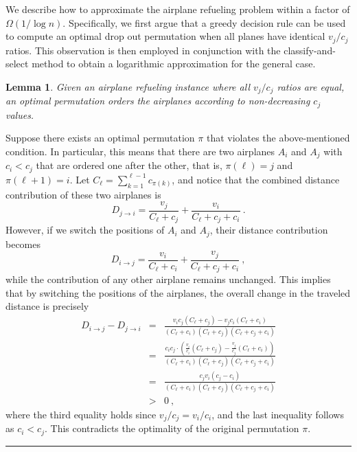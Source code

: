 \documentclass[11pt]{article}
\theoremstyle{plain}
\newtheorem{lemma}[theorem]{Lemma}
\theoremstyle{definition}
\newcommand{\qedsymb}{\hfill{\rule{2mm}{2mm}}}
\renewenvironment{proof}{\begin{trivlist} \item[\hspace{\labelsep}{\bf \noindent Proof.\/}] }{\qedsymb\end{trivlist}}\newenvironment{proofof}[1]{\begin{trivlist} \item[\hspace{\labelsep}{\bf \noindent Proof of #1.\/}] }{\qedsymb\end{trivlist}}\newenvironment{MyEqn}[1]{\setlength\arraycolsep{2pt}\begin{eqnarray*} #1}{\end{eqnarray*}}
\begin{document}
We describe how to approximate the airplane refueling problem within a factor of $\Omega(1 / \log n )$. Specifically, we first argue that a greedy decision rule can be used to compute an optimal drop out permutation when all planes have identical $v_j / c_j$ ratios. This observation is then employed in conjunction with the classify-and-select method to obtain a logarithmic approximation for the general case.

\begin{lemma} \label{lem:equal_ratio}
Given an airplane refueling instance where all $v_j / c_j$ ratios are equal, an optimal permutation orders the airplanes according to non-decreasing $c_j$ values.
\end{lemma}
\begin{proof}
Suppose there exists an optimal permutation $\pi$ that violates the above-mentioned condition. In particular, this means that there are two airplanes $A_i$ and $A_j$ with $c_i < c_j$ that are ordered one after the other, that is, $\pi(\ell) = j$ and $\pi(\ell + 1) = i$. Let $C_\ell = \sum_{k=1}^{\ell-1} c_{\pi(k)}$, and notice that the combined distance contribution of these two airplanes is
$$
D_{j \to i} = \frac{v_j}{C_\ell + c_j} + \frac{v_i}{C_\ell + c_j + c_i} \ .
$$
However, if we switch the positions of $A_i$ and $A_j$, their distance contribution becomes
$$
D_{i \to j} = \frac{v_i}{C_\ell + c_i} + \frac{v_j}{C_\ell + c_j + c_i} \ ,
$$
while the contribution of any other airplane remains unchanged. This implies that by switching the positions of the airplanes, the overall change in the traveled distance is precisely
\begin{eqnarray*}
D_{i \to j} - D_{j \to i} & = & \frac{ v_i c_j (C_\ell + c_j) - v_j c_i (C_\ell + c_i) }{(C_\ell + c_i)(C_\ell + c_j)(C_\ell + c_j + c_i)} \\
& = & \frac{c_i c_j \cdot\left(\frac{v_i}{c_i} (C_\ell + c_j) - \frac{v_j}{c_j} (C_\ell + c_i)\right)}{(C_\ell + c_i)(C_\ell + c_j)(C_\ell + c_j + c_i)} \\
& = & \frac{ c_j v_i (c_j - c_i) }{(C_\ell + c_i)(C_\ell + c_j)(C_\ell + c_j + c_i)} \\
& > & 0 \ ,
\end{eqnarray*}
where the third equality holds since $v_j / c_j = v_i / c_i$, and the last inequality follows as $c_i < c_j$. This contradicts the optimality of the original permutation $\pi$.~ 
\end{proof}
\end{document}
